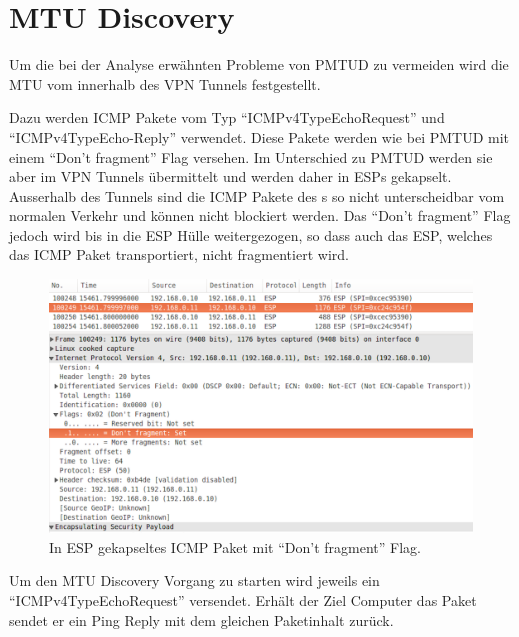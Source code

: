 \cleardoublepage
\section{MTU Discovery}
\label{sec:MTU Discovery}

Um die bei der Analyse erwähnten Probleme von \acs{PMTUD} zu vermeiden wird die \acs{MTU} vom \tool{} innerhalb des \acs{VPN} Tunnels festgestellt.

Dazu werden \acs{ICMP} Pakete vom Typ \enquote{ICMPv4TypeEchoRequest} und \enquote{ICMPv4TypeEcho-Reply} verwendet. Diese Pakete werden wie bei \acs{PMTUD} mit einem \enquote{Don't fragment} Flag versehen. Im Unterschied zu \acs{PMTUD} werden sie aber im \acs{VPN} Tunnels übermittelt und werden daher in \acs{ESP}s gekapselt. Ausserhalb des Tunnels sind die ICMP Pakete des \tool{}s so nicht unterscheidbar vom normalen Verkehr und können nicht blockiert werden.
Das \enquote{Don't fragment} Flag jedoch wird bis in die \acs{ESP} Hülle weitergezogen, so dass auch das \acs{ESP}, welches das \acs{ICMP} Paket transportiert, nicht fragmentiert wird.

\begin{figure}[H]
    \begin{center}
        \includegraphics[trim=1 0 0 0,clip,width=\textwidth]{mainpart/implementation/img/ESP_DontFragment}
    \end{center}
    \caption{In ESP gekapseltes ICMP Paket mit \enquote{Don't fragment} Flag.}
\end{figure}

Um den \acs{MTU} Discovery Vorgang zu starten wird jeweils ein \enquote{ICMPv4TypeEchoRequest} versendet. Erhält der Ziel Computer das Paket sendet er ein Ping Reply mit dem gleichen Paketinhalt zurück.

